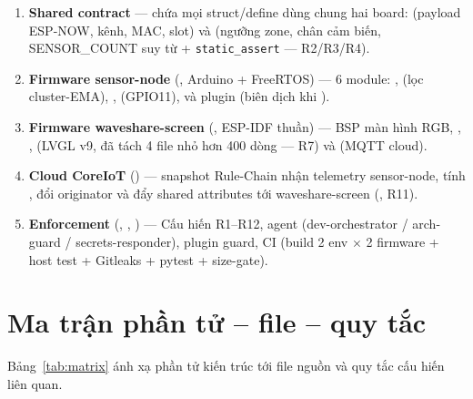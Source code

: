 \begin{enumerate}[label=\textbf{Tầng \arabic*.}, leftmargin=*]
\item \textbf{Shared contract} —  chứa mọi struct/define dùng chung
  hai board:  (payload ESP-NOW, kênh, MAC, slot) và
   (ngưỡng zone, chân cảm biến, SENSOR\_COUNT suy từ
   + \verb+static_assert+ — R2/R3/R4).

\item \textbf{Firmware sensor-node} (, Arduino + FreeRTOS) —
  6 module: ,  (lọc cluster-EMA),
  ,  (GPIO11),  và plugin
   (biên dịch khi ).

\item \textbf{Firmware waveshare-screen} (, ESP-IDF thuần) —
  BSP màn hình RGB, , ,
   (LVGL v9, đã tách 4 file nhỏ hơn 400 dòng — R7) và
   (MQTT cloud).

\item \textbf{Cloud CoreIoT} () — snapshot Rule-Chain
  nhận telemetry sensor-node, tính , đổi originator và đẩy shared
  attributes tới waveshare-screen (, R11).

\item \textbf{Enforcement} (, , ) —
  Cấu hiến R1--R12, agent (dev-orchestrator / arch-guard / secrets-responder), plugin
  guard, CI (build 2 env $\times$ 2 firmware + host test + Gitleaks + pytest + size-gate).
\end{enumerate}

\section{Ma trận phần tử -- file -- quy tắc}
\label{sec:matrix}

Bảng~\ref{tab:matrix} ánh xạ phần tử kiến trúc tới file nguồn và quy tắc cấu hiến liên quan.

